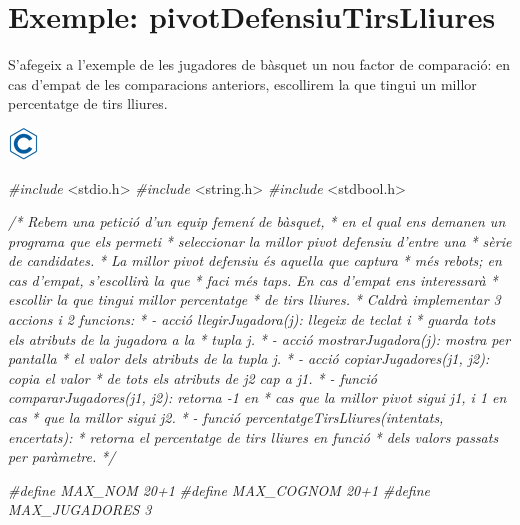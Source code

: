 \documentclass[]{book}
\newenvironment{Shaded}{\begin{snugshade}}{\end{snugshade}}
\newcommand{\ImportTok}[1]{#1}
\newcommand{\CommentTok}[1]{\textcolor[rgb]{0.56,0.35,0.01}{\textit{#1}}}
\newcommand{\PreprocessorTok}[1]{\textcolor[rgb]{0.56,0.35,0.01}{\textit{#1}}}
\begin{document}
\section{Exemple:
pivotDefensiuTirsLliures}\label{exemple-pivotdefensiutirslliures}

S'afegeix a l'exemple de les jugadores de bàsquet un nou factor de
comparació: en cas d'empat de les comparacions anteriors, escollirem la
que tingui un millor percentatge de tirs lliures.

\includegraphics{./img/c.png}

\begin{Shaded}
\begin{Highlighting}[]
\PreprocessorTok{#include }\ImportTok{<stdio.h>}
\PreprocessorTok{#include }\ImportTok{<string.h>}
\PreprocessorTok{#include }\ImportTok{<stdbool.h>}

\CommentTok{/* Rebem una petició d'un equip femení de bàsquet,}
\CommentTok{ * en el qual ens demanen un programa que els permeti}
\CommentTok{ * seleccionar la millor pivot defensiu d'entre una }
\CommentTok{ * sèrie de candidates.}
\CommentTok{ * La millor pivot defensiu és aquella que captura}
\CommentTok{ * més rebots; en cas d'empat, s'escollirà la que}
\CommentTok{ * faci més taps. En cas d'empat ens interessarà}
\CommentTok{ * escollir la que tingui millor percentatge}
\CommentTok{ * de tirs lliures.}
\CommentTok{ * Caldrà implementar 3 accions i 2 funcions:}
\CommentTok{ * - acció llegirJugadora(j): llegeix de teclat i}
\CommentTok{ *   guarda tots els atributs de la jugadora a la}
\CommentTok{ *   tupla j.}
\CommentTok{ * - acció mostrarJugadora(j): mostra per pantalla}
\CommentTok{ *   el valor dels atributs de la tupla j.}
\CommentTok{ * - acció copiarJugadores(j1, j2): copia el valor}
\CommentTok{ *   de tots els atributs de j2 cap a j1.}
\CommentTok{ * - funció compararJugadores(j1, j2): retorna -1 en }
\CommentTok{ *   cas que la millor pivot sigui j1, i 1 en cas }
\CommentTok{ *   que la millor sigui j2.}
\CommentTok{ * - funció percentatgeTirsLliures(intentats, encertats):}
\CommentTok{ *   retorna el percentatge de tirs lliures en funció}
\CommentTok{ *   dels valors passats per paràmetre.}
\CommentTok{ */}
 
\PreprocessorTok{#define MAX_NOM 20+1}
\PreprocessorTok{#define MAX_COGNOM 20+1}
\PreprocessorTok{#define MAX_JUGADORES 3}


\end{Highlighting}
\end{Shaded}
\end{document}
